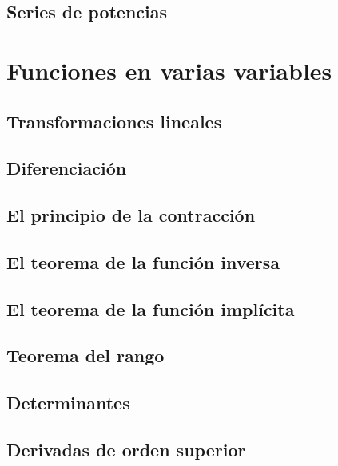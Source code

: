 \documentclass[12pt,]{krantz}
\theoremstyle{definition}
\theoremstyle{definition}
\theoremstyle{definition}
\theoremstyle{remark}
\begin{document}
\section{Series de potencias}\label{series-de-potencias}

\chapter{Funciones en varias
variables}\label{funciones-en-varias-variables}

\section{Transformaciones lineales}\label{transformaciones-lineales-1}

\section{Diferenciación}\label{diferenciacion-1}

\section{El principio de la
contracción}\label{el-principio-de-la-contraccion}

\section{El teorema de la función
inversa}\label{el-teorema-de-la-funcion-inversa}

\section{El teorema de la función
implícita}\label{el-teorema-de-la-funcion-implicita}

\section{Teorema del rango}\label{teorema-del-rango}

\section{Determinantes}\label{determinantes}

\section{Derivadas de orden superior}\label{derivadas-de-orden-superior}
\end{document}
